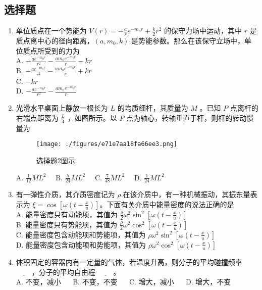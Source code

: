 

\subsection{选择题}
\begin{enumerate}
\item 单位质点在一个势能为 $V(r) = -\frac{a}{r}e^{-m_{o}r}+\frac{k}{2}r^{2}$ 的保守力场中运动，其中 $r$ 是质点离中心的径向距离，$(a,m_{0},k)$ 是势能参数。那么在该保守立场中，单位质点所受到的力为\\
A. $-\frac{ae^{-m_{0}r}}{r^{2}}-\frac{am_{0}e^{-m_{0}r}}{r}-kr$\\
B. $-\frac{ae^{-m_{0}r}}{r^{2}}-\frac{am_{0}e^{-m_{0}r}}{r}+kr$\\
C. $-kr$\\
D. $-\frac{ae^{-m_{0}r}}{r^{2}}-\frac{am_{0}e^{-m_{0}r}}{r}$\\

\item 光滑水平桌面上静放一根长为 $L$ 的均质细杆，其质量为 $M$ 。已知 $P$ 点离杆的右端点距离为 $\frac{L}{4}$ ，如图所示。以 $P$ 点为轴心，转轴垂直于杆，则杆的转动惯量为\\
\begin{figure}[ht]
\centering
\texttt{[image: ./figures/e71e7aa18fa66ee3.png]}
\caption{选择题2图示} \label{fig_CAS17_1}
\end{figure}
A. $\frac{1}{12}ML^{2} \quad$
B. $\frac{5}{24}ML^{2} \quad$
C. $\frac{7}{48}ML^{2} \quad$
D. $\frac{1}{24}ML^{2} \quad$

\item 有一弹性介质，其介质密度记为 $\rho$.在该介质中，有一种机械振动，其振东量表示为 $\xi = \cos{[\omega(t-\frac{x}{u})]}$。下面有关介质中能量密度的说法正确的是\\
A. 能量密度只有动能项，其值为 $\frac{\rho}{2}\omega^{2}\sin^{2}{[\omega(t-\frac{x}{u})]}$\\
B. 能量密度只有势能项，其值为 $\frac{\rho}{2}\omega^{2}\cos^{2}{[\omega(t-\frac{x}{u})]}$\\
C. 能量密度包含动能项和势能项，其值为 $\rho\omega^{2}\sin^{2}{[\omega(t-\frac{x}{u})]}$\\
D. 能量密度包含动能项和势能项，其值为 $\rho\omega^{2}\cos^{2}{[\omega(t-\frac{x}{u})]}$\\

\item 体积固定的容器内有一定量的气体，若温度升高，则分子的平均碰撞频率 $\underline{~~~~~~~~~~}$，分子的平均自由程 $\underline{~~~~~~~~~~}$。\\
A. 不变，减小 $\quad$
B. 不变，不变 $\quad$
C. 增大，减小 $\quad$
D. 增大，不变 $\quad$


\end{enumerate}
